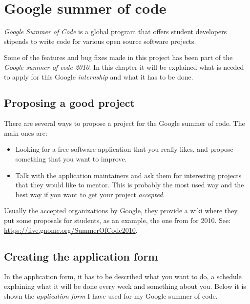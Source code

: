 
\chapter{Google summer of code}


\emph{Google Summer of Code} is a global program that offers student developers stipends to write code for various open source software projects.\cite{website:soc}

Some of the features and bug fixes made in this project has been part of the \emph{Google summer of code 2010}. In this chapter it will be explained what is needed to apply for this Google \emph{internship} and what it has to be done.


\section{Proposing a good project}\label{sec:GoodProject}

There are several ways to propose a project for the Google summer of code. The main ones are:
\begin{itemize}
  \item Looking for a free software application that you really likes, and propose something that you want to improve.
  \item Talk with the application maintainers and ask them for interesting projects that they would like to mentor. This is probably the most used way and the best way if you want to get your project \emph{accepted}.
\end{itemize}

Usually the accepted organizations by Google, they provide a wiki where they put some proposals for students, as an example, the one from \GNOME for 2010. See: \url{https://live.gnome.org/SummerOfCode2010}.

\section{Creating the application form}\label{ApplicationForm}

In the application form, it has to be described what you want to do, a schedule explaining what it will be done every week and something about you. Below it is shown the \emph{application form} I have used for my Google summer of code.

